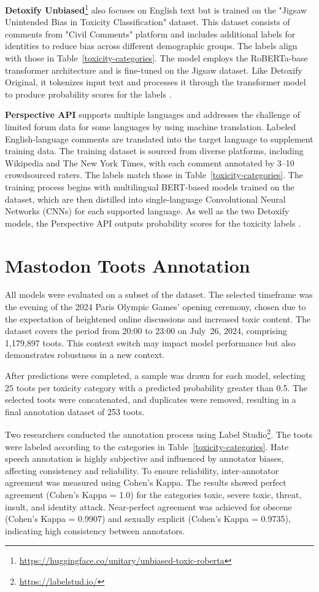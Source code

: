 \textbf{Detoxify Unbiased}\footnote{\url{https://huggingface.co/unitary/unbiased-toxic-roberta}} also focuses on English text but is trained on the "Jigsaw Unintended Bias in Toxicity Classification" dataset. This dataset consists of comments from "Civil Comments" platform and includes additional labels for identities to reduce bias across different demographic groups. The labels align with those in Table~\ref{toxicity-categories}. The model employs the RoBERTa-base transformer architecture and is fine-tuned on the Jigsaw dataset. Like Detoxify Original, it tokenizes input text and processes it through the transformer model to produce probability scores for the labels \cite{detoxify:medium}.

\textbf{Perspective API} supports multiple languages and addresses the challenge of limited forum data for some languages by using machine translation. Labeled English-language comments are translated into the target language to supplement training data. The training dataset is sourced from diverse platforms, including Wikipedia and The New York Times, with each comment annotated by 3--10 crowdsourced raters. The labels match those in Table~\ref{toxicity-categories}. The training process begins with multilingual BERT-based models trained on the dataset, which are then distilled into single-language Convolutional Neural Networks (CNNs) for each supported language. As well as the two Detoxify models, the Perspective API outputs probability scores for the toxicity labels \cite{lees:2022}.

\section{Mastodon Toots Annotation} \label{annotation}
All models were evaluated on a subset of the dataset. The selected timeframe was the evening of the 2024 Paris Olympic Games' opening ceremony, chosen due to the expectation of heightened online discussions and increased toxic content. The dataset covers the period from 20:00 to 23:00 on July~26, 2024, comprising 1,179,897 toots. This context switch may impact model performance but also demonstrates robustness in a new context.

After predictions were completed, a sample was drawn for each model, selecting 25 toots per toxicity category with a predicted probability greater than 0.5. The selected toots were concatenated, and duplicates were removed, resulting in a final annotation dataset of 253 toots.

Two researchers conducted the annotation process using Label Studio\footnote{\url{https://labelstud.io/}}. The toots were labeled according to the categories in Table~\ref{toxicity-categories}. Hate speech annotation is highly subjective and influenced by annotator biases, affecting consistency and reliability. To ensure reliability, inter-annotator agreement was measured using Cohen's Kappa. The results showed perfect agreement (Cohen's Kappa = 1.0) for the categories toxic, severe toxic, threat, insult, and identity attack. Near-perfect agreement was achieved for obscene (Cohen's Kappa = 0.9907) and sexually explicit (Cohen's Kappa = 0.9735), indicating high consistency between annotators.


